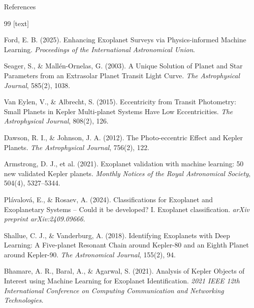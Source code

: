 \documentclass[9pt, aspectratio=169]{beamer}
\begin{document}
\begin{frame}[allowframebreaks]{References}
    \begin{thebibliography}{99}
        [text]
        
        Ford, E. B. (2025). 
        \newblock Enhancing Exoplanet Surveys via Physics-informed Machine Learning. 
        \newblock \emph{Proceedings of the International Astronomical Union}.

        Seager, S., \& Mallén-Ornelas, G. (2003).
        \newblock A Unique Solution of Planet and Star Parameters from an Extrasolar Planet Transit Light Curve.
        \newblock \emph{The Astrophysical Journal}, 585(2), 1038.

        Van Eylen, V., \& Albrecht, S. (2015).
        \newblock Eccentricity from Transit Photometry: Small Planets in Kepler Multi-planet Systems Have Low Eccentricities.
        \newblock \emph{The Astrophysical Journal}, 808(2), 126.

        Dawson, R. I., \& Johnson, J. A. (2012).
        \newblock The Photo-eccentric Effect and Kepler Planets.
        \newblock \emph{The Astrophysical Journal}, 756(2), 122.

        Armstrong, D. J., et al. (2021).
        \newblock Exoplanet validation with machine learning: 50 new validated Kepler planets.
        \newblock \emph{Monthly Notices of the Royal Astronomical Society}, 504(4), 5327--5344.

        Plávalová, E., \& Rosaev, A. (2024).
        \newblock Classifications for Exoplanet and Exoplanetary Systems -- Could it be developed? I. Exoplanet classification.
        \newblock \emph{arXiv preprint arXiv:2409.09666}.

        Shallue, C. J., \& Vanderburg, A. (2018).
        \newblock Identifying Exoplanets with Deep Learning: A Five-planet Resonant Chain around Kepler-80 and an Eighth Planet around Kepler-90.
        \newblock \emph{The Astronomical Journal}, 155(2), 94.

        Bhamare, A. R., Baral, A., \& Agarwal, S. (2021).
        \newblock Analysis of Kepler Objects of Interest using Machine Learning for Exoplanet Identification.
        \newblock \emph{2021 IEEE 12th International Conference on Computing Communication and Networking Technologies}.
    \end{thebibliography}
\end{frame}
\end{document}
